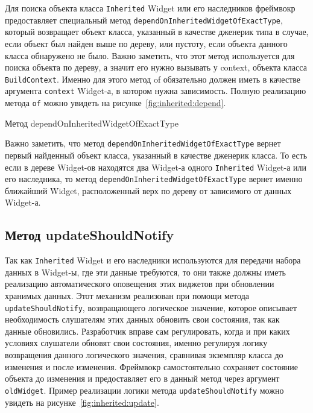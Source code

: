 Для поиска объекта класса \texttt{Inherited} Widget
или его наследников фреймвокр предоставляет специальный метод
\texttt{dependOnInheritedWidgetOfExactType},
который возвращает объект класса, указанный в качестве дженерик типа в случае,
если объект был найден выше по дереву, или пустоту,
если объекта данного класса обнаружено не было.
Важно заметить, что этот метод используется для поиска объекта по дереву,
а значит его нужно вызывать у context, объекта класса \texttt{BuildContext}.
Именно для этого метод of обязательно должен иметь в качестве аргумента
\texttt{context} Widget-а, в котором нужна зависимость.
Полную реализацию метода \texttt{of}
можно увидеть на рисунке~\ref{fig:inherited:depend}.

\begin{image}
	\caption{Метод dependOnInheritedWidgetOfExactType}
	\label{fig:inherited:depend}
\end{image}

Важно заметить,
что метод \texttt{dependOnInheritedWidgetOfExactType}
вернет первый найденный объект класса, указанный в качестве дженерик класса.
То есть если в дереве Widget-ов находятся
два Widget-а одного \texttt{Inherited} Widget-а или его наследника,
то метод \texttt{dependOnInheritedWidgetOfExactType}
вернет именно ближайший Widget,
расположенный верх по дереву от зависимого от данных Widget-а.

\subsection{Метод updateShouldNotify}

Так как \texttt{Inherited} Widget
и его наследники используются для передачи набора данных в Widget-ы,
где эти данные требуются,
то они также должны иметь реализацию автоматического оповещения
этих виджетов при обновлении хранимых данных.
Этот механизм реализован при помощи метода \texttt{updateShouldNotify},
возвращающего логическое значение,
которое описывает необходимость слушателям этих данных обновить свои состояния,
так как данные обновились.
Разработчик вправе сам регулировать,
когда и при каких условиях слушатели обновят свои состояния,
именно регулируя логику возвращения данного логического значения,
сравнивая экземпляр класса до изменения и после изменения.
Фреймвокр самостоятельно сохраняет состояние объекта до изменения
и предоставляет его в данный метод через аргумент \texttt{oldWidget}.
Пример реализации логики метода \texttt{updateShouldNotify}
можно увидеть на рисунке~\ref{fig:inherited:update}.

